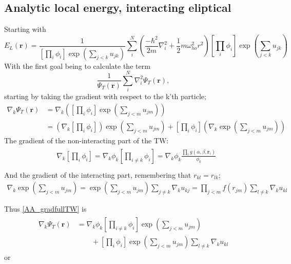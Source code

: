 \documentclass[%
oneside,                 %
final,                   %
10pt]{article}
\begin{document}
\begin{appendices}
\subsection*{Analytic local energy, interacting eliptical} \label{APP_1:le_2}
Starting with
\begin{equation*}
    E_L(\mathbf{r}) =\frac{1}{ 
    \left[
    \prod_i \phi_i
\right]
\exp{\left(\sum_{j<k}u_{jk}\right)}
}  \sum_i^N \left(\frac{-\hbar^2}{2m}{\nabla }_{i}^2 +\frac{1}{2}m\omega_{ho}^2r^2 \right)  \left[
    \prod_i \phi_i
\right]
\exp{\left(\sum_{j<k}u_{jk}\right)}
 \end{equation*}
With the first goal being to calculate the term
\begin{equation*}
   \frac{1}{\Psi_T(\mathbf{r})}\sum_i^{N}\nabla_i^2\Psi_T(\mathbf{r}),
\end{equation*}
starting by taking the gradient with respect to the k'th particle;
\begin{align*}
  \nabla_k\Psi_T(\mathbf{r}) &= \nabla_k \left(\left[
    \prod_i \phi_i
\right]
\exp{\left(\sum_{j<m}u_{jm}\right)}\right) \\
 &= \left( \nabla_k \left[
    \prod_i \phi_i
\right] \right)
\exp{\left(\sum_{j<m} u_{jm}\right)} +
\left[
    \prod_i \phi_i
\right]
\left( \nabla_k \exp{\left(\sum_{j<m} u_{jm} \right)}\right) \label{AA_gradfullTW}
\end{align*}
The gradient of the non-interacting part of the TW:
\begin{align}
\begin{split}
& \nabla_k \left[
    \prod_i \phi_i
\right] =  \nabla_k \phi_k \left[
    \prod_{i\neq k} \phi_i
\right]= \nabla_k \phi_k \frac{\prod_i g(\alpha,\beta,\mathbf{r}_i)}{\phi_k} \\
\end{split}
\end{align}
And the gradient of the interacting part, remembering that $r_{kl}=r_{lk}$;
\begin{align}
\nabla_k \exp{\left(\sum_{j<m} u_{jm} \right)}
= \exp{\left(\sum_{j<m} u_{jm} \right)} \sum_{j\neq k} \nabla_k u_{kj}
=  \prod_{j<m} f(r_{jm}) \sum_{l\neq k} \nabla_k u_{kl}
\end{align}

Thus \eqref{AA_gradfullTW} is
\begin{align}
\begin{split}
  \nabla_k\Psi_T(\mathbf{r}) &= \nabla_k\phi_k\left[\prod_{i\ne k}\phi_i\right]\exp{\left(\sum_{j<m}u_{jm}\right)}
  \\
  &\qquad
  +  \left[\prod_i\phi_i\right]
  \exp{\left(\sum_{j<m}u_{jm}\right)}\sum_{l\ne k}\nabla_k u_{kl}
\end{split}
\end{align}
or


\end{appendices}
\end{document}
